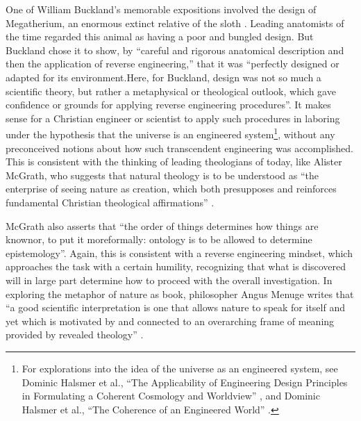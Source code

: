 One of William Buckland’s memorable expositions involved the design of
Megatherium, an enormous extinct relative of the
sloth \citep[][p.~245]{roberts1999}.
Leading anatomists of the time regarded this
animal as having a poor and bungled design. But Buckland chose it to
show, by ``careful and rigorous anatomical description and then the
application of reverse engineering,'' that it was ``perfectly designed or
adapted for its environment.{\jdots}Here, for Buckland, design was not so much
a scientific theory, but rather a metaphysical or theological outlook,
which gave confidence or grounds for applying reverse engineering
procedures''\citep[][p.~248]{roberts1999}.
It makes sense for a Christian
engineer or scientist to apply such procedures in laboring under the
hypothesis that the universe is an engineered
system\footnote{%
For explorations into the idea of the universe as an
engineered system, see Dominic Halsmer et al., ``The Applicability of
Engineering Design Principles in Formulating a Coherent Cosmology and
Worldview'' , and Dominic Halsmer et al., ``The Coherence of an
Engineered World'' .
}, without any preconceived notions about how
such transcendent engineering was accomplished. This is consistent with
the thinking of leading theologians of today, like Alister McGrath, who
suggests that natural theology is to be understood as ``the enterprise of
seeing nature as creation, which both presupposes and reinforces
fundamental Christian theological affirmations'' \citep[][p.~64]{mcgrath2006}.

McGrath also asserts that ``the order of things determines how things are
known{\jdots}or, to put it more{\jdots}formally: ontology is to be allowed to
determine epistemology''\citep[][pp. xv--xvi]{mcgrath2006}. Again, this is consistent
with a reverse engineering mindset, which approaches the task with a
certain humility, recognizing that what is discovered will in large
part determine how to proceed with the overall investigation. In
exploring the metaphor of nature as book, philosopher Angus Menuge
writes that ``a good scientific interpretation is one that allows nature
to speak for itself and yet which is motivated by and connected to an
overarching frame of meaning provided by revealed
theology'' \citep[][p.~96]{menuge2003}.

